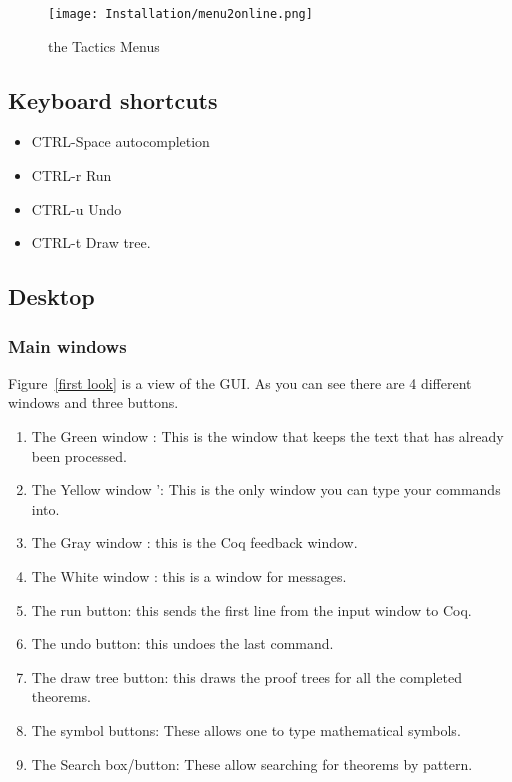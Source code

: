 \begin{figure}[h!]
\texttt{[image: Installation/menu2online.png]}


\caption{the Tactics Menus}\label{tacticsonline}
\end{figure}
\subsection{Keyboard shortcuts}

\begin{itemize}
\item CTRL-Space autocompletion
\item CTRL-r Run
\item CTRL-u Undo
\item CTRL-t Draw tree. 
\end{itemize}









\subsection{Desktop}
\subsubsection{Main windows}
Figure~\ref{first look} is a view of the GUI. As you can see there are 4 different windows and three buttons.
\begin{enumerate}
\item The Green window  : This is the window that keeps the text that has already been processed.
\item The Yellow window ': This is the only window you can type your commands into.
\item The Gray  window : this is the Coq feedback window. 
\item The White window : this is a window for messages.
\item The run button: this sends the first line from the input window to Coq.
\item The undo button: this undoes the last command.
\item The draw tree button: this draws the proof trees for all the completed theorems.
\item The symbol buttons: These allows one to type mathematical symbols.
\item The Search box/button: These allow searching for theorems by pattern.
\end{enumerate}


